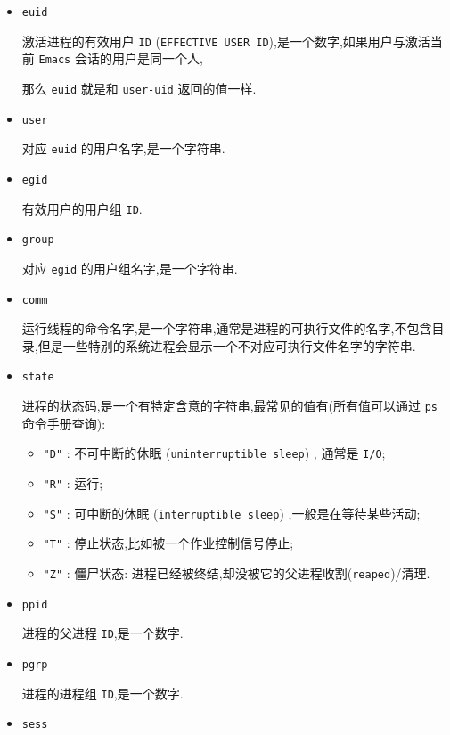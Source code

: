 \documentclass[11pt]{article}
\begin{document}
\begin{itemize}
\item \texttt{euid}

激活进程的有效用户 \texttt{ID} (\texttt{EFFECTIVE USER ID}),是一个数字,如果用户与激活当前 \texttt{Emacs} 会话的用户是同一个人,

那么 \texttt{euid} 就是和 \texttt{user-uid} 返回的值一样.

\item \texttt{user}

对应 \texttt{euid} 的用户名字,是一个字符串.

\item \texttt{egid}

有效用户的用户组 \texttt{ID}.

\item \texttt{group}

对应 \texttt{egid} 的用户组名字,是一个字符串.

\item \texttt{comm}

运行线程的命令名字,是一个字符串,通常是进程的可执行文件的名字,不包含目录,但是一些特别的系统进程会显示一个不对应可执行文件名字的字符串.

\item \texttt{state}

进程的状态码,是一个有特定含意的字符串,最常见的值有(所有值可以通过 \texttt{ps} 命令手册查询):

\begin{itemize}
\item \texttt{"D"} : 不可中断的休眠 (\texttt{uninterruptible sleep}) , 通常是 \texttt{I/O};
\item \texttt{"R"} : 运行;
\item \texttt{"S"} : 可中断的休眠 (\texttt{interruptible sleep}) ,一般是在等待某些活动;
\item \texttt{"T"} : 停止状态,比如被一个作业控制信号停止;
\item \texttt{"Z"} : 僵尸状态: 进程已经被终结,却没被它的父进程收割(\texttt{reaped})/清理.
\end{itemize}

\item \texttt{ppid}

进程的父进程 \texttt{ID},是一个数字.

\item \texttt{pgrp}

进程的进程组 \texttt{ID},是一个数字.

\item \texttt{sess}


\end{itemize}
\end{document}
